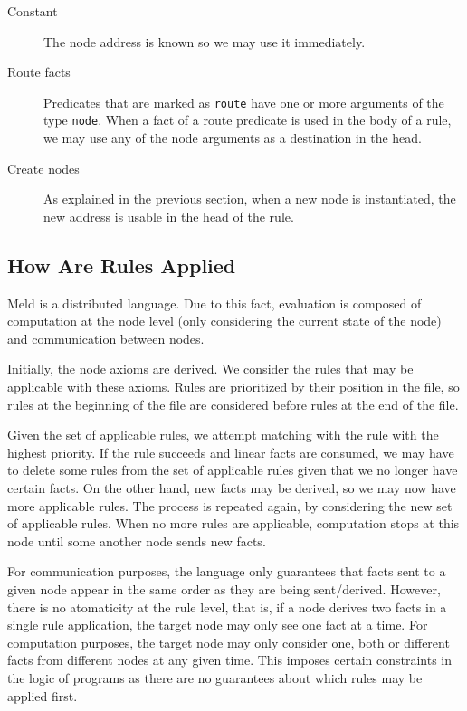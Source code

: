 \documentclass[11pt]{article}
\begin{document}
\begin{description}
\item[Constant] The node address is known so we may use it immediately.
\item[Route facts] Predicates that are marked as \texttt{route} have one or more arguments of the type \texttt{node}. When a fact of a route predicate is used in the body of a rule, we may use any of the node arguments as a destination in the head.
\item[Create nodes] As explained in the previous section, when a new node is instantiated, the new address is usable in the head of the rule.
\end{description}

\subsection{How Are Rules Applied}

Meld is a distributed language. Due to this fact, evaluation is composed of computation at the node level (only considering the current state of the node) and communication between nodes.

Initially, the node axioms are derived. We consider the rules that may be applicable with these axioms. Rules are prioritized by their position in the file, so rules at the beginning of the file are considered before rules at the end of the file.

Given the set of applicable rules, we attempt matching with the rule with the highest priority. If the rule succeeds and linear facts are consumed, we may have to delete some rules from the set of applicable rules given that we no longer have certain facts. On the other hand, new facts may be derived, so we may now have more applicable rules. The process is repeated again, by considering the new set of applicable rules. When no more rules are applicable, computation stops at this node until some another node sends new facts.

For communication purposes, the language only guarantees that facts sent to a given node appear in the same order as they are being sent/derived. However, there is no atomaticity at the rule level, that is, if a node derives two facts in a single rule application, the target node may only see one fact at a time. For computation purposes, the target node may only consider one, both or different facts from different nodes at any given time. This imposes certain constraints in the logic of programs as there are no guarantees about which rules may be applied first.
\end{document}
